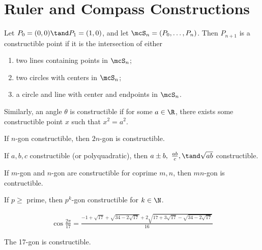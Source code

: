 \documentclass[a4paper]{article}
\begin{document}
\section{Ruler and Compass Constructions}
\begin{tdefinition}
  Let \( P_0 = (0,0)\tand P_1 = (1,0) \), and let \( \mcS_n = (P_0,\ldots,P_n) \).
  Then \( P_{n+1} \) is a constructible point if it is the intersection of either \begin{enumerate}
    \item two lines containing points in \( \mcS_n \);
    \item two circles with centers in \( \mcS_n \);
    \item a circle and line with center and endpoints in \( \mcS_n \).
  \end{enumerate}
  Similarly, an angle \( \theta \) is constructible if for some \( a\in \R \), there exists some constructible point \( x \) such that \( x^2 = a^2 \).
\end{tdefinition}

\begin{tlemma}
  If \( n \)-gon constructible, then \( 2n \)-gon is constructible.
\end{tlemma}

\begin{tlemma}
  If \( a,b,c \) constructible (or polyquadratic), then \( a\pm b,\ \frac{ab}{c},\tand \sqrt{ab} \) constructible.
\end{tlemma}

\begin{tfact}
If \( m \)-gon and \( n \)-gon are constructible for coprime \( m,n \), then \( mn \)-gon is contructible.
\end{tfact}

\begin{tfact}
  If \( p\geq \) prime, then \( p^k \)-gon constructible for \( k\in \N \).
\end{tfact}

\begin{ttheorem}[Gauss]
  \begin{align*}
    \cos \frac{2\pi}{17} = \frac{-1 + \sqrt{17}+\sqrt{34-2\sqrt{17}}+2\sqrt{17+3\sqrt{17}-\sqrt{34-2\sqrt{17}}}}{16}
  \end{align*}
\end{ttheorem}

\begin{tcorollary}
  The 17-gon is constructible.
\end{tcorollary}
\end{document}
